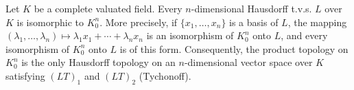 Let $K$ be a complete valuated field. Every $n$-dimensional Hausdorff t.v.s. $L$ over $K$ is isomorphic to $K_0^n$. More precisely, if $\{x_1, \ldots, x_n\}$ is a basis of $L$, the mapping $(\lambda_1, \ldots, \lambda_n) \mapsto \lambda_1 x_1 + \cdots + \lambda_n x_n$ is an isomorphism of $K_0^n$ onto $L$, and every isomorphism of $K_0^n$ onto $L$ is of this form. Consequently, the product topology on $K_0^n$ is the only Hausdorff topology on an $n$-dimensional vector space over $K$ satisfying $(LT)_1$ and $(LT)_2$ (Tychonoff).

